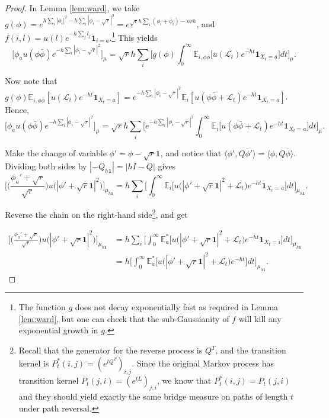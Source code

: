 \documentclass[a4paper, 11pt]{article}
\newcommand{\E}{\mathbb{E}}
\newcommand{\allone}{\mathbf{1}}
\newcommand{\ind}{\mathbf{1}}
\newcommand{\Ell}{\mathcal{L}}
\begin{document}
\begin{proof}
In Lemma \ref{lem:ward}, we take $g(\phi)=e^{h\sum_i |\phi_i|^2-h\sum_i|\phi_i-\sqrt{r}|^2}=e^{\sqrt{r}h\sum_i (\phi_i+\bar{\phi}_i)-nrh}$, and $f(i,l)= u(l)e^{-h\sum_jl_j}\ind_{i=a}$.\footnote{The function $g$ does not decay exponentially fast as
required in Lemma \ref{lem:ward}, but one can check that the sub-Gaussianity of $f$ will kill any exponential growth in $g$.}  This yields
\[\big[ \phi_a u(\phi\bar{\phi})e^{-h\sum_i|\phi_i-\sqrt{r}|^2}\big]_\mu=\sqrt{r}h\sum_i\bigg[ g(\phi)\int_0^\infty\E_{i,\phi\bar{\phi}}\big[ u(\Ell_t)e^{-h t}\ind_{X_t=a}\big]dt\bigg]_\mu.\]

Now note that $g(\phi)\E_{i,\phi\bar{\phi}}[ u(\Ell_t)e^{-ht}\ind_{X_t=a}]=e^{-h\sum_i|\phi_i-\sqrt{r}|^2}\E_i[ u(\phi\bar{\phi}+\Ell_t)e^{-ht}\ind_{X_t=a}]$. Hence,
\[\big[ \phi_a u(\phi\bar{\phi})e^{-h\sum_i|\phi_i-\sqrt{r}|^2}\big]_\mu=\sqrt{r}h\sum_i\bigg[ e^{-h\sum_i|\phi_i-\sqrt{r}|^2}\int_0^\infty\E_i\big[ u(\phi\bar{\phi}+\Ell_t)e^{-ht}\ind_{X_t=a}\big]dt\bigg]_\mu.\]

Make the change of variable $\phi'=\phi-\sqrt{r}\allone$, and notice that $\langle \phi',Q\bar{\phi}'\rangle=\langle \phi,Q\bar{\phi}\rangle$.
Dividing both sides by $|-Q_{h\allone}|=|hI-Q|$ gives
\[\bigg[ \bigg(\frac{\phi_a'+\sqrt{r}}{\sqrt{r}}\bigg) u\big(|\phi'+\sqrt{r}\allone|^2\big)\bigg]_{\mu_{h\allone}}
= h\sum_i\bigg[\int_0^\infty\E_i\big[ u\big(|\phi'+\sqrt{r}\allone|^2+\Ell_t\big)e^{-ht}\ind_{X_t=a}\big]dt\bigg]_{\mu_{h\allone}}.\]

Reverse the chain on the right-hand side\footnote{Recall that the generator for the reverse process is $Q^T$, and the transition kernel is $P_t^*(i,j)=(e^{tQ^T})_{i,j}$. Since the original Markov process has transition kernel $P_t(j,i)=(e^{tL})_{j,i}$, we know that $P_t^{*}(i,j)=P_t(j,i)$ and they should yield exactly the same bridge measure on paths of length $t$ under path reversal.}, and get

\begin{equation*}
\begin{aligned}
\bigg[ \bigg(\frac{\phi_a'+\sqrt{r}}{\sqrt{r}}\bigg) u\big(|\phi'+\sqrt{r}\allone|^2\big)\bigg]_{\mu_{h\allone}}
&= h\sum_i\bigg[\int_0^\infty\E_a^*\big[ u\big(|\phi'+\sqrt{r}\allone|^2+\Ell_t\big)e^{-ht}\ind_{X_t=i}\big]dt\bigg]_{\mu_{h\allone}}\\
&= h\bigg[\int_0^\infty\E_a^*\big[ u\big(|\phi'+\sqrt{r}\allone|^2+\Ell_t\big)e^{-ht}\big]dt\bigg]_{\mu_{h\allone}}.
\end{aligned}
\end{equation*}


\end{proof}
\end{document}
